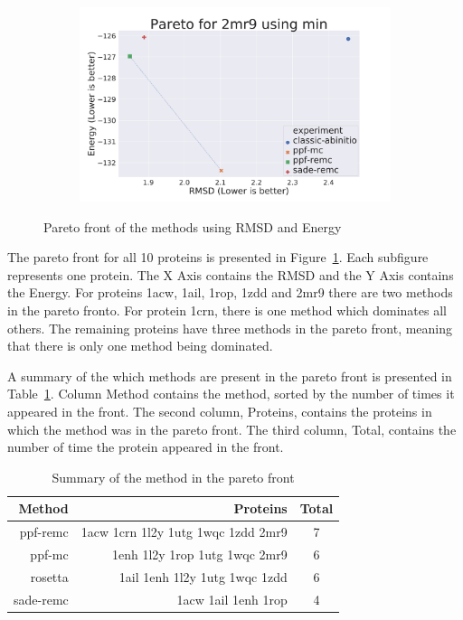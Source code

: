 \begin{figure}
\begin{subfigure}{0.49\linewidth}
  \end{subfigure}
%
  \begin{subfigure}{0.49\linewidth}
    \includegraphics[width=1\linewidth]{Figuras/pareto/2mr9_best_by_rmsd_min.pdf}
  \end{subfigure}
  \caption{Pareto front of the methods using RMSD and Energy}
  \label{fig:pareto-front}
\end{figure}

The pareto front for all 10 proteins is presented in
Figure~\ref{fig:pareto-front}. Each subfigure represents one protein. The X
Axis contains the RMSD and the Y Axis contains the Energy. For proteins 1acw,
1ail, 1rop, 1zdd and 2mr9 there are two methods in the pareto fronto. For
protein 1crn, there is one method which dominates all others. The remaining
proteins have three methods in the pareto front, meaning that there is only one
method being dominated.

A summary of the which methods are present in the pareto front is presented
in Table~\ref{tab:pareto-front-summary}. Column Method contains the method,
sorted by the number of times it appeared in the front. The second column,
Proteins, contains the proteins in which the method was in the pareto front.
The third column, Total, contains the number of time the protein appeared in the
front.

\begin{table}
  \centering
  \begin{tabular}{r | r | c}
    Method    & Proteins                           & Total \\ \hline \hline
    ppf-remc  & 1acw 1crn 1l2y 1utg 1wqc 1zdd 2mr9 & 7     \\ \hline
    ppf-mc    & 1enh 1l2y 1rop 1utg 1wqc 2mr9      & 6     \\ \hline
    rosetta   & 1ail 1enh 1l2y 1utg 1wqc 1zdd      & 6     \\ \hline
    sade-remc & 1acw 1ail 1enh 1rop                & 4     \\
  \end{tabular}
  \caption{Summary of the method in the pareto front}
  \label{tab:pareto-front-summary}
\end{table}

